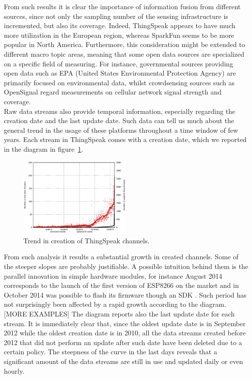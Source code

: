 \documentclass[conference]{IEEEtran}
\begin{document}
From such results it is clear the importance of information fusion from different sources, since not only the sampling number of the sensing infrastructure is incremented, but also its coverage.
Indeed, ThingSpeak appears to have much more utilization in the European region, whereas SparkFun seems to be more popular in North America.
Furthermore, this consideration might be extended to different macro topic areas, meaning that some open data sources are specialized on a specific field of measuring.
For instance, governmental sources providing open data such as EPA (United States Environmental Protection Agency) \cite{epa} are primarily focused on environmental data, whilst crowdsensing sources such as OpenSignal \cite{opensignal} regard measurements on cellular network signal strength and coverage.
\\

Raw data streams also provide temporal information, especially regarding the creation date and the last update date.
Such data can tell us much about the general trend in the usage of these platforms throughout a time window of few years.
Each stream in ThingSpeak comes with a creation date, which we reported in the diagram in figure~\ref{creationtrend}.
\begin{figure}[!t]
\centering
\includegraphics[width=0.50\textwidth]{img/bars.eps} 
\caption{Trend in creation of ThingSpeak channels.}
\label{creationtrend}
\end{figure}
From such analysis it results a substantial growth in created channels.
Some of the steeper slopes are probably justifiable.
A possible intuition behind them is the parallel innovation in simple hardware modules, for instance August 2014 corresponds to the launch of the first version of ESP8266 on the market and in October 2014 was possible to flash its firmware though an SDK \cite{espressif}.
Such period has not surprisingly been affected by a rapid growth according to the diagram. [MORE EXAMPLES]
The diagram reports also the last update date for each stream.
It is immediately clear that, since the oldest update date is in September 2012 while the oldest creation date is in 2010, all the data streams created before 2012 that did not perform an update after such date have been deleted due to a certain policy.
The steepness of the curve in the last days reveals that a significant amount of the data streams are still in use and updated daily or even hourly.
\\
\end{document}
